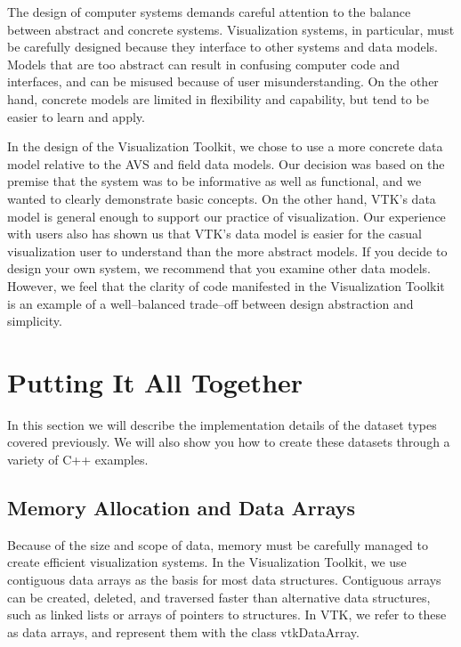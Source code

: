 The design of computer systems demands careful attention to the balance between abstract and concrete systems. Visualization systems, in particular, must be carefully designed because they interface to other systems and data models. Models that are too abstract can result in confusing computer code and interfaces, and can be misused because of user misunderstanding. On the other hand, concrete models are limited in flexibility and capability, but tend to be easier to learn and apply.

In the design of the Visualization Toolkit, we chose to use a more concrete data model relative to the AVS and field data models. Our decision was based on the premise that the system was to be informative as well as functional, and we wanted to clearly demonstrate basic concepts. On the other hand, VTK's data model is general enough to support our practice of visualization. Our experience with users also has shown us that VTK's data model is easier for the casual visualization user to understand than the more abstract models. If you decide to design your own system, we recommend that you examine other data models. However, we feel that the clarity of code manifested in the Visualization Toolkit is an example of a well--balanced trade--off between design abstraction and simplicity.

\section{Putting It All Together}

In this section we will describe the implementation details of the dataset types covered previously. We will also show you how to create these datasets through a variety of C++ examples.

\subsection{Memory Allocation and Data Arrays}

Because of the size and scope of data, memory must be carefully managed to create efficient visualization systems. In the Visualization Toolkit, we use contiguous data arrays as the basis for most data structures. Contiguous arrays can be created, deleted, and traversed faster than alternative data structures, such as linked lists or arrays of pointers to structures. In VTK, we refer to these as data arrays, and represent them with the class vtkDataArray.

